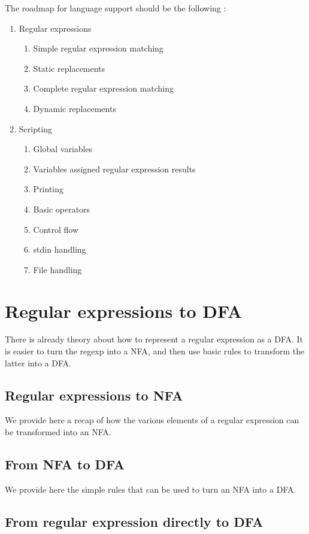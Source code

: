 \documentclass[11pt,a4paper]{article}
\begin{document}
The roadmap for language support should be the following :
\begin{enumerate}
\item Regular expressions
	\begin{enumerate}
	\item Simple regular expression matching
	\item Static replacements
	\item Complete regular expression matching
	\item Dynamic replacements	
	\end{enumerate}
\item Scripting
	\begin{enumerate}
	\item Global variables
	\item Variables assigned regular expression results
	\item Printing
	\item Basic operators
	\item Control flow
	\item stdin handling
	\item File handling
	\end{enumerate}
\end{enumerate}

\section{Regular expressions to DFA}

There is already theory about how to represent a regular expression as a DFA. It is easier to turn the regexp into a NFA, and then use basic rules to transform the latter into a DFA.

\subsection{Regular expressions to NFA}

We provide here a recap of how the various elements of a regular expression can be transformed into an NFA.

\subsection{From NFA to DFA}

We provide here the simple rules that can be used to turn an NFA into a DFA.

\subsection{From regular expression directly to DFA}
\end{document}
